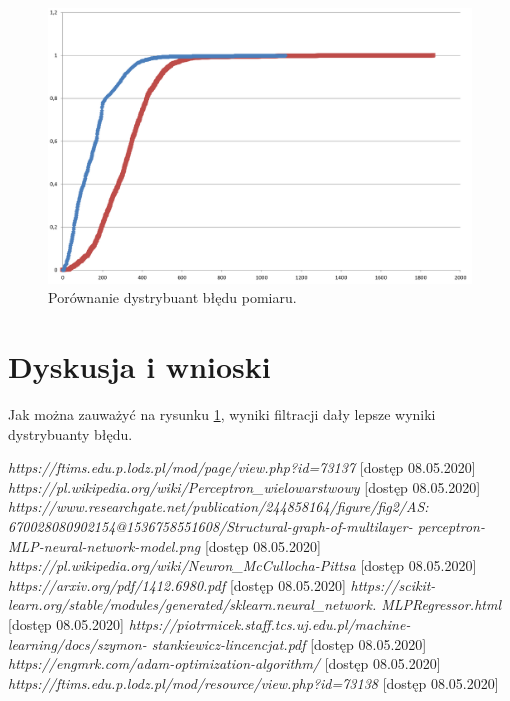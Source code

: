 \documentclass{classrep}
\begin{document}
\begin{figure}[h!]
	\centering
	\includegraphics[width=1\textwidth]{dystrybuanta.png}
	\caption{Porównanie dystrybuant błędu pomiaru.}
	\label{dystrybuanta}
\end{figure}



\section{Dyskusja i wnioski} %
Jak można zauważyć na rysunku \ref{dystrybuanta}, wyniki filtracji dały lepsze wyniki dystrybuanty błędu. 

\begin{thebibliography}{0}
  	 \textsl{https://ftims.edu.p.lodz.pl/mod/page/view.php?id=73137} [dostęp 08.05.2020]
	 \textsl{https://pl.wikipedia.org/wiki/Perceptron\_wielowarstwowy} [dostęp 08.05.2020]
	 \textsl{https://www.researchgate.net/publication/244858164/figure/fig2/AS:
		670028080902154@1536758551608/Structural-graph-of-multilayer-
		perceptron-MLP-neural-network-model.png} [dostęp 08.05.2020]
	 \textsl{https://pl.wikipedia.org/wiki/Neuron\_McCullocha-Pittsa} [dostęp 08.05.2020]
	 \textsl{https://arxiv.org/pdf/1412.6980.pdf} [dostęp 08.05.2020]
	 \textsl{https://scikit-learn.org/stable/modules/generated/sklearn.neural\_network.
		MLPRegressor.html} [dostęp 08.05.2020]
	 \textsl{https://piotrmicek.staff.tcs.uj.edu.pl/machine-learning/docs/szymon-
		stankiewicz-lincencjat.pdf} [dostęp 08.05.2020]
	 \textsl{https://engmrk.com/adam-optimization-algorithm/} [dostęp 08.05.2020]
	 \textsl{https://ftims.edu.p.lodz.pl/mod/resource/view.php?id=73138} [dostęp 08.05.2020]
\end{thebibliography}
\end{document}
